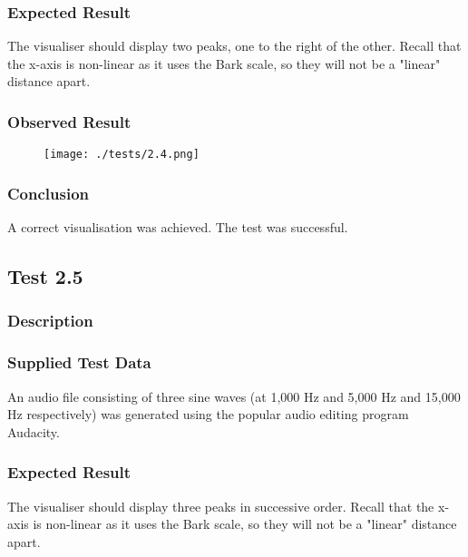 \subsubsection*{Expected Result}
The visualiser should display two peaks, one to the right of the other. Recall that the x-axis is non-linear as it uses the Bark scale, so they will not be a "linear" distance apart.

\subsubsection*{Observed Result}
\label{sec:evidence2.4}
\begin{figure}[H]
	\texttt{[image: ./tests/2.4.png]}
\end{figure}

\subsubsection*{Conclusion}
A correct visualisation was achieved. The test was successful.


\pagebreak
\subsection{Test 2.5}
\subsubsection*{Description}
\paragraph{}
{
	\centering
}

\subsubsection*{Supplied Test Data}
An audio file consisting of three sine waves (at 1,000 Hz and 5,000 Hz and 15,000 Hz respectively) was generated using the popular audio editing program Audacity.

\subsubsection*{Expected Result}
The visualiser should display three peaks in successive order. Recall that the x-axis is non-linear as it uses the Bark scale, so they will not be a "linear" distance apart.

